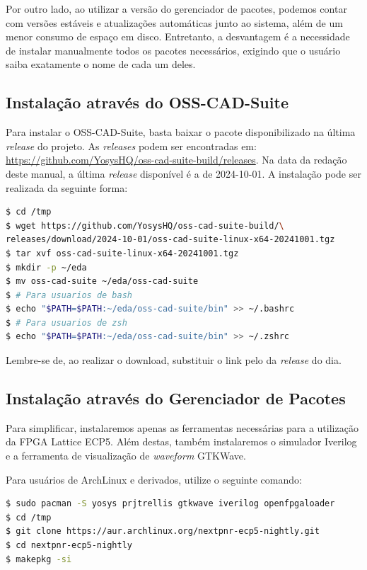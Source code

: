 \documentclass{report}
\begin{document}
Por outro lado, ao utilizar a versão do gerenciador de pacotes, podemos contar com versões estáveis e atualizações automáticas junto ao sistema, além de um menor consumo de espaço em disco. Entretanto, a desvantagem é a necessidade de instalar manualmente todos os pacotes necessários, exigindo que o usuário saiba exatamente o nome de cada um deles.

\subsection{Instalação através do OSS-CAD-Suite}

Para instalar o OSS-CAD-Suite, basta baixar o pacote disponibilizado na última \textit{release} do projeto. As \textit{releases} podem ser encontradas em: \url{https://github.com/YosysHQ/oss-cad-suite-build/releases}. Na data da redação deste manual, a última \textit{release} disponível é a de 2024-10-01. A instalação pode ser realizada da seguinte forma:

\begin{lstlisting}[language=bash]
$ cd /tmp
$ wget https://github.com/YosysHQ/oss-cad-suite-build/\
releases/download/2024-10-01/oss-cad-suite-linux-x64-20241001.tgz
$ tar xvf oss-cad-suite-linux-x64-20241001.tgz
$ mkdir -p ~/eda
$ mv oss-cad-suite ~/eda/oss-cad-suite
$ # Para usuarios de bash
$ echo "$PATH=$PATH:~/eda/oss-cad-suite/bin" >> ~/.bashrc
$ # Para usuarios de zsh
$ echo "$PATH=$PATH:~/eda/oss-cad-suite/bin" >> ~/.zshrc
\end{lstlisting}

Lembre-se de, ao realizar o download, substituir o link pelo da \textit{release} do dia.


\subsection{Instalação através do Gerenciador de Pacotes}

Para simplificar, instalaremos apenas as ferramentas necessárias para a utilização da FPGA Lattice ECP5. Além destas, também instalaremos o simulador Iverilog e a ferramenta de visualização de \textit{waveform} GTKWave.

Para usuários de ArchLinux e derivados, utilize o seguinte comando:

\begin{lstlisting}[language=bash]
$ sudo pacman -S yosys prjtrellis gtkwave iverilog openfpgaloader
$ cd /tmp
$ git clone https://aur.archlinux.org/nextpnr-ecp5-nightly.git
$ cd nextpnr-ecp5-nightly
$ makepkg -si
\end{lstlisting}
\end{document}
